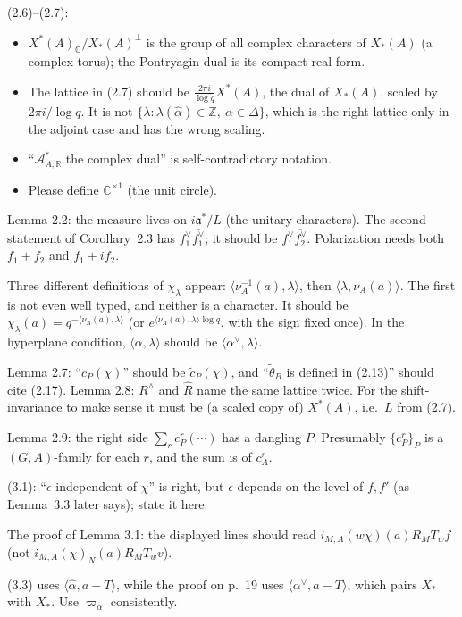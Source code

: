\documentclass[11pt]{article}
\newcommand{\fa}{\mathfrak{a}}
\newcommand{\ip}[1]{\langle #1\rangle}
\begin{document}
\begin{description}[leftmargin=1.2em,style=nextline]
\item[p.~7] (2.6)--(2.7):
\begin{itemize}
\item $X^*(A)_\mathbb{C}/X_*(A)^\perp$ is the group of all complex characters of $X_*(A)$ (a complex torus); the Pontryagin dual is its compact real form.
\item The lattice in (2.7) should be $\frac{2\pi i}{\log q}X^*(A)$, the dual of $X_*(A)$, scaled by $2\pi i/\log q$. It is not $\{\lambda:\lambda(\hat\alpha)\in\mathbb{Z},\ \alpha\in\Delta\}$, which is the right lattice only in the adjoint case and has the wrong scaling.
\item ``$\mathcal{A}^*_{A,\mathbb{R}}$ the complex dual'' is self-contradictory notation.
\item Please define $\mathbb{C}^{\times1}$ (the unit circle).
\end{itemize}
\item[p.~9] Lemma 2.2: the measure lives on $i\fa^*/L$ (the unitary characters). The second statement of Corollary~2.3 has $f_1^\vee\overline{f_1^\vee}$; it should be $f_1^\vee\overline{f_2^\vee}$. Polarization needs both $f_1+f_2$ and $f_1+if_2$.
\item[pp.~11--13] Three different definitions of $\chi_\lambda$ appear: $\ip{\nu_A^{-1}(a),\lambda}$, then $\ip{\lambda,\nu_A(a)}$. The first is not even well typed, and neither is a character. It should be $\chi_\lambda(a)=q^{-\ip{\nu_A(a),\lambda}}$ (or $e^{\ip{\nu_A(a),\lambda}\log q}$, with the sign fixed once). In the hyperplane condition, $\ip{\alpha,\lambda}$ should be $\ip{\alpha^\vee,\lambda}$.
\item[p.~12] Lemma 2.7: ``$c_P(\chi)$'' should be $\tilde c_P(\chi)$, and ``$\tilde\theta_B$ is defined in (2.13)'' should cite (2.17). Lemma 2.8: $R^\wedge$ and $\hat R$ name the same lattice twice. For the shift-invariance to make sense it must be (a scaled copy of) $X^*(A)$, i.e.\ $L$ from (2.7).
\item[p.~13] Lemma 2.9: the right side $\sum_r c^r_P(\cdots)$ has a dangling $P$. Presumably $\{c^r_P\}_P$ is a $(G,A)$-family for each $r$, and the sum is of $c^r_A$.
\item[p.~13] (3.1): ``$\epsilon$ independent of $\chi$'' is right, but $\epsilon$ depends on the level of $f,f'$ (as Lemma~3.3 later says); state it here.
\item[p.~14] The proof of Lemma 3.1: the displayed lines should read $i_{M,A}(w\chi)(a)R_MT_wf$ (not $i_{M,A}(\chi)_N(a)R_MT_wv$).
\item[p.~18] (3.3) uses $\ip{\hat\alpha,a-T}$, while the proof on p.~19 uses $\ip{\alpha^\vee,a-T}$, which pairs $X_*$ with $X_*$. Use $\varpi_\alpha$ consistently.

\end{description}
\end{document}
